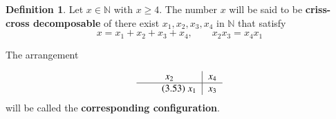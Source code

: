 \documentclass[a4paper,12pt]{article}
\theoremstyle{definition}
\theoremstyle{underlinethm}
\newtheorem{definition}{Definition}[section]
\theoremstyle{definition}
\begin{document}
\begin{definition}\label{definition-3.5}
Let $x\in \mathbb{N}$ with $x \geq 4$. The number $x$ will be said to be \textbf{criss-cross decomposable} of there exist $x_{1}, x_{2}, x_{3}, x_{4}$ in $\mathbb{N}$ that satisfy
\begin{equation}
x= x_{1} + x_{2} + x_{3} + x_{4}, \qquad x_{2} x_{3} = x_{4} x_{1}\tag{3.52}\label{eq-3.52}
\end{equation}

The arrangement 

\begin{equation}
\begin{tabular}{c|c}
$x_{2}$ & $x_{4}$\\\hline\tag{3.53}\label{eq-3.53}
$x_{1}$ & $x_{3}$
\end{tabular}
\end{equation}
will be called the \textbf{corresponding configuration}.
\end{definition}
\end{document}

